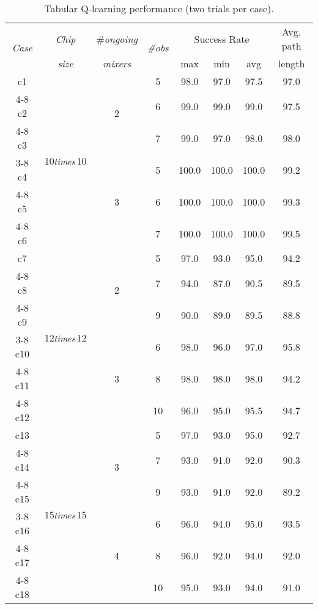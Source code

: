 \begin{table}[t]
\centering
\caption{Tabular Q-learning performance (two trials per case).}
\label{tab:results-ql}
\begin{tabular}{c|c|c|c|c|c|c|c}
\hline
\multirow{2}{*}{\textit{Case}} & \textit{Chip} & \#\textit{ongoing} & \multirow{2}{*}{\textit{\#obs}} & \multicolumn{3}{c|}{Success Rate} & Avg. path\\
 & \textit{size} & \textit{mixers} & & max & min & avg & length\\
\hline
c1 & \multirow{6}{*}{10$\\times$10} & \multirow{3}{*}{2} & 5 & 98.0 & 97.0 & 97.5 & 97.0\\
\cline{4-8}
c2 & & & 6 & 99.0 & 99.0 & 99.0 & 97.5\\
\cline{4-8}
c3 & & & 7 & 99.0 & 97.0 & 98.0 & 98.0\\
\cline{3-8}
c4 & & \multirow{3}{*}{3} & 5 & 100.0 & 100.0 & 100.0 & 99.2\\
\cline{4-8}
c5 & & & 6 & 100.0 & 100.0 & 100.0 & 99.3\\
\cline{4-8}
c6 & & & 7 & 100.0 & 100.0 & 100.0 & 99.5\\
\hline
c7 & \multirow{6}{*}{12$\\times$12} & \multirow{3}{*}{2} & 5 & 97.0 & 93.0 & 95.0 & 94.2\\
\cline{4-8}
c8 & & & 7 & 94.0 & 87.0 & 90.5 & 89.5\\
\cline{4-8}
c9 & & & 9 & 90.0 & 89.0 & 89.5 & 88.8\\
\cline{3-8}
c10 & & \multirow{3}{*}{3} & 6 & 98.0 & 96.0 & 97.0 & 95.8\\
\cline{4-8}
c11 & & & 8 & 98.0 & 98.0 & 98.0 & 94.2\\
\cline{4-8}
c12 & & & 10 & 96.0 & 95.0 & 95.5 & 94.7\\
\hline
c13 & \multirow{6}{*}{15$\\times$15} & \multirow{3}{*}{3} & 5 & 97.0 & 93.0 & 95.0 & 92.7\\
\cline{4-8}
c14 & & & 7 & 93.0 & 91.0 & 92.0 & 90.3\\
\cline{4-8}
c15 & & & 9 & 93.0 & 91.0 & 92.0 & 89.2\\
\cline{3-8}
c16 & & \multirow{3}{*}{4} & 6 & 96.0 & 94.0 & 95.0 & 93.5\\
\cline{4-8}
c17 & & & 8 & 96.0 & 92.0 & 94.0 & 92.0\\
\cline{4-8}
c18 & & & 10 & 95.0 & 93.0 & 94.0 & 91.0\\
\hline
\end{tabular}
\end{table}
